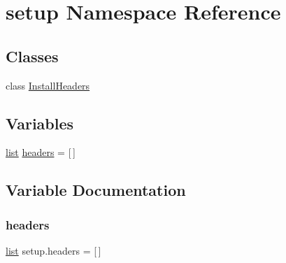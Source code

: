\hypertarget{namespacesetup}{}\section{setup Namespace Reference}
\label{namespacesetup}
\subsection*{Classes}
\begin{DoxyCompactItemize}
\item 
class \mbox{\hyperlink{classsetup_1_1_install_headers}{Install\+Headers}}
\end{DoxyCompactItemize}
\subsection*{Variables}
\begin{DoxyCompactItemize}
\item 
\mbox{\hyperlink{classlist}{list}} \mbox{\hyperlink{namespacesetup_a9cbbe596ac3a0fab93b32f0022f75113}{headers}} = \mbox{[}$\,$\mbox{]}
\end{DoxyCompactItemize}


\subsection{Variable Documentation}
\mbox{\label{namespacesetup_a9cbbe596ac3a0fab93b32f0022f75113}} 
\subsubsection{\texorpdfstring{headers}{headers}}
{\footnotesize\ttfamily \mbox{\hyperlink{classlist}{list}} setup.\+headers = \mbox{[}$\,$\mbox{]}}

